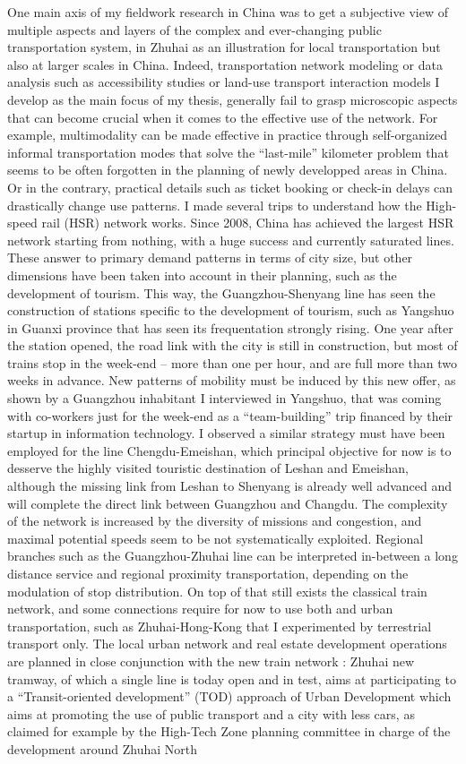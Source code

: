 One main axis of my fieldwork research in China was to get a subjective view of multiple aspects and layers of the complex and ever-changing public transportation system, in Zhuhai as an illustration for local transportation but also at larger scales in China. Indeed, transportation network modeling or data analysis such as accessibility studies or land-use transport interaction models I develop as the main focus of my thesis, generally fail to grasp microscopic aspects that can become crucial when it comes to the effective use of the network. For example, multimodality can be made effective in practice through self-organized informal transportation modes that solve the ``last-mile'' kilometer problem that seems to be often forgotten in the planning of newly developped areas in China. Or in the contrary, practical details such as ticket booking or check-in delays can drastically change use patterns. I made several trips to understand how the High-speed rail (HSR) network works. Since 2008, China has achieved the largest HSR network starting from nothing, with a huge success and currently saturated lines. These answer to primary demand patterns in terms of city size, but other dimensions have been taken into account in their planning, such as the development of tourism. This way, the Guangzhou-Shenyang line has seen the construction of stations specific to the development of tourism, such as Yangshuo in Guanxi province that has seen its frequentation strongly rising. One year after the station opened, the road link with the city is still in construction, but most of trains stop in the week-end – more than one per hour, and are full more than two weeks in advance. New patterns of mobility must be induced by this new offer, as shown by a Guangzhou inhabitant I interviewed in Yangshuo, that was coming with co-workers just for the week-end as a ``team-building'' trip financed by their startup in information technology. I observed a similar strategy must have been employed for the line Chengdu-Emeishan, which principal objective for now is to desserve the highly visited touristic destination of Leshan and Emeishan, although the missing link from Leshan to Shenyang is already well advanced and will complete the direct link between Guangzhou and Changdu. The complexity of the network is increased by the diversity of missions and congestion, and maximal potential speeds seem to be not systematically exploited. Regional branches such as the Guangzhou-Zhuhai line can be interpreted in-between a long distance service and regional proximity transportation, depending on the modulation of stop distribution. On top of that still exists the classical train network, and some connections require for now to use both and urban transportation, such as Zhuhai-Hong-Kong that I experimented by terrestrial transport only. The local urban network and real estate development operations are planned in close conjunction with the new train network : Zhuhai new tramway, of which a single line is today open and in test, aims at participating to a “Transit-oriented development” (TOD) approach of Urban Development which aims at promoting the use of public transport and a city with less cars, as claimed for example by the High-Tech Zone planning committee in charge of the development around Zhuhai North 